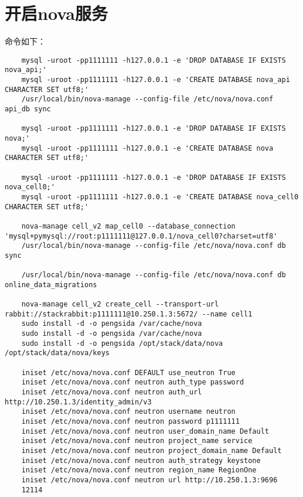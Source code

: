 \documentclass[a4paper,left=1.5cm,right=1.5cm,11pt]{article}
\begin{document}
\section{开启nova服务}
	命令如下：
	\begin{lstlisting}
	mysql -uroot -pp1111111 -h127.0.0.1 -e 'DROP DATABASE IF EXISTS nova_api;'
	mysql -uroot -pp1111111 -h127.0.0.1 -e 'CREATE DATABASE nova_api CHARACTER SET utf8;'
	/usr/local/bin/nova-manage --config-file /etc/nova/nova.conf api_db sync
	
	mysql -uroot -pp1111111 -h127.0.0.1 -e 'DROP DATABASE IF EXISTS nova;'
	mysql -uroot -pp1111111 -h127.0.0.1 -e 'CREATE DATABASE nova CHARACTER SET utf8;'

	mysql -uroot -pp1111111 -h127.0.0.1 -e 'DROP DATABASE IF EXISTS nova_cell0;'
	mysql -uroot -pp1111111 -h127.0.0.1 -e 'CREATE DATABASE nova_cell0 CHARACTER SET utf8;'
	
	nova-manage cell_v2 map_cell0 --database_connection 'mysql+pymysql://root:p1111111@127.0.0.1/nova_cell0?charset=utf8'
	/usr/local/bin/nova-manage --config-file /etc/nova/nova.conf db sync

	/usr/local/bin/nova-manage --config-file /etc/nova/nova.conf db online_data_migrations

	nova-manage cell_v2 create_cell --transport-url rabbit://stackrabbit:p1111111@10.250.1.3:5672/ --name cell1
	sudo install -d -o pengsida /var/cache/nova
	sudo install -d -o pengsida /var/cache/nova
	sudo install -d -o pengsida /opt/stack/data/nova /opt/stack/data/nova/keys

	iniset /etc/nova/nova.conf DEFAULT use_neutron True
	iniset /etc/nova/nova.conf neutron auth_type password
	iniset /etc/nova/nova.conf neutron auth_url http://10.250.1.3/identity_admin/v3
	iniset /etc/nova/nova.conf neutron username neutron
	iniset /etc/nova/nova.conf neutron password p1111111
	iniset /etc/nova/nova.conf neutron user_domain_name Default
	iniset /etc/nova/nova.conf neutron project_name service
	iniset /etc/nova/nova.conf neutron project_domain_name Default
	iniset /etc/nova/nova.conf neutron auth_strategy keystone
	iniset /etc/nova/nova.conf neutron region_name RegionOne
	iniset /etc/nova/nova.conf neutron url http://10.250.1.3:9696
	12114
	\end{lstlisting}
\end{document}
